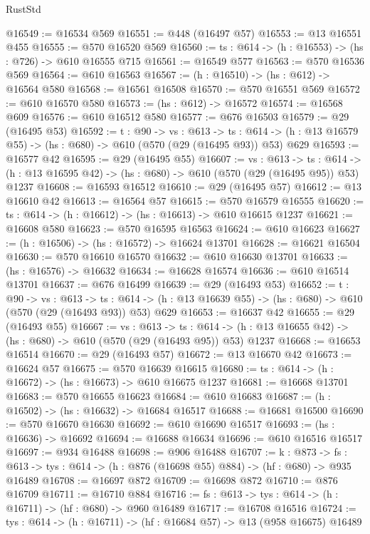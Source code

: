 \begin{lexlean}{RustStd}
\begin{coremodule}
@16549 := @16534 @569
@16551 := @448 (@16497 @57)
@16553 := @13 @16551 @455
@16555 := @570 @16520 @569
@16560 := {ts : @614} -> (h : @16553) -> (hs : @726) -> @610 @16555 @715
@16561 := @16549 @577
@16563 := @570 @16536 @569
@16564 := @610 @16563
@16567 := (h : @16510) -> (hs : @612) -> @16564 @580
@16568 := @16561 @16508
@16570 := @570 @16551 @569
@16572 := @610 @16570 @580
@16573 := (hs : @612) -> @16572
@16574 := @16568 @609
@16576 := @610 @16512 @580
@16577 := @676 @16503
@16579 := @29 (@16495 @53)
@16592 := {t : @90} ->
  {vs : @613} ->
  {ts : @614} -> (h : @13 @16579 @55) -> (hs : @680) -> @610 (@570 (@29 (@16495 @93)) @53) @629
@16593 := @16577 @42
@16595 := @29 (@16495 @55)
@16607 := {vs : @613} ->
  {ts : @614} -> (h : @13 @16595 @42) -> (hs : @680) -> @610 (@570 (@29 (@16495 @95)) @53) @1237
@16608 := @16593 @16512
@16610 := @29 (@16495 @57)
@16612 := @13 @16610 @42
@16613 := @16564 @57
@16615 := @570 @16579 @16555
@16620 := {ts : @614} -> (h : @16612) -> (hs : @16613) -> @610 @16615 @1237
@16621 := @16608 @580
@16623 := @570 @16595 @16563
@16624 := @610 @16623
@16627 := (h : @16506) -> (hs : @16572) -> @16624 @13701
@16628 := @16621 @16504
@16630 := @570 @16610 @16570
@16632 := @610 @16630 @13701
@16633 := (hs : @16576) -> @16632
@16634 := @16628 @16574
@16636 := @610 @16514 @13701
@16637 := @676 @16499
@16639 := @29 (@16493 @53)
@16652 := {t : @90} ->
  {vs : @613} ->
  {ts : @614} -> (h : @13 @16639 @55) -> (hs : @680) -> @610 (@570 (@29 (@16493 @93)) @53) @629
@16653 := @16637 @42
@16655 := @29 (@16493 @55)
@16667 := {vs : @613} ->
  {ts : @614} -> (h : @13 @16655 @42) -> (hs : @680) -> @610 (@570 (@29 (@16493 @95)) @53) @1237
@16668 := @16653 @16514
@16670 := @29 (@16493 @57)
@16672 := @13 @16670 @42
@16673 := @16624 @57
@16675 := @570 @16639 @16615
@16680 := {ts : @614} -> (h : @16672) -> (hs : @16673) -> @610 @16675 @1237
@16681 := @16668 @13701
@16683 := @570 @16655 @16623
@16684 := @610 @16683
@16687 := (h : @16502) -> (hs : @16632) -> @16684 @16517
@16688 := @16681 @16500
@16690 := @570 @16670 @16630
@16692 := @610 @16690 @16517
@16693 := (hs : @16636) -> @16692
@16694 := @16688 @16634
@16696 := @610 @16516 @16517
@16697 := @934 @16488
@16698 := @906 @16488
@16707 := {k : @873} ->
  {fs : @613} -> {tys : @614} -> (h : @876 (@16698 @55) @884) -> (hf : @680) -> @935 @16489
@16708 := @16697 @872
@16709 := @16698 @872
@16710 := @876 @16709
@16711 := @16710 @884
@16716 := {fs : @613} -> {tys : @614} -> (h : @16711) -> (hf : @680) -> @960 @16489
@16717 := @16708 @16516
@16724 := {tys : @614} -> (h : @16711) -> (hf : @16684 @57) -> @13 (@958 @16675) @16489

\end{coremodule}
\end{lexlean}
